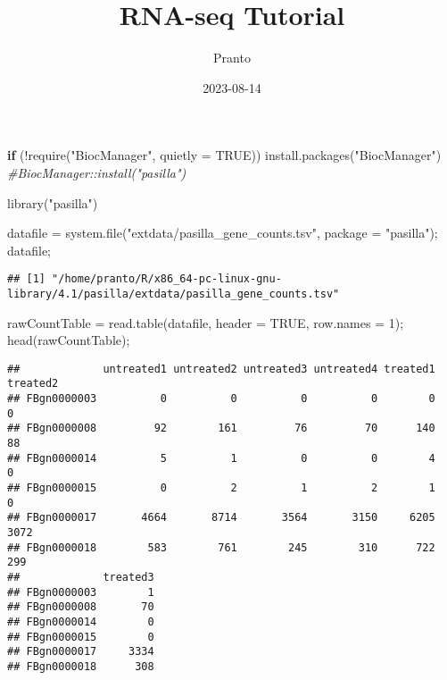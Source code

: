 \documentclass[
]{article}
\title{RNA-seq Tutorial}
\author{Pranto}
\date{2023-08-14}
\newenvironment{Shaded}{\begin{snugshade}}{\end{snugshade}}
\newcommand{\AttributeTok}[1]{\textcolor[rgb]{0.77,0.63,0.00}{#1}}
\newcommand{\CommentTok}[1]{\textcolor[rgb]{0.56,0.35,0.01}{\textit{#1}}}
\newcommand{\ConstantTok}[1]{\textcolor[rgb]{0.00,0.00,0.00}{#1}}
\newcommand{\ControlFlowTok}[1]{\textcolor[rgb]{0.13,0.29,0.53}{\textbf{#1}}}
\newcommand{\DecValTok}[1]{\textcolor[rgb]{0.00,0.00,0.81}{#1}}
\newcommand{\FunctionTok}[1]{\textcolor[rgb]{0.00,0.00,0.00}{#1}}
\newcommand{\NormalTok}[1]{#1}
\newcommand{\OtherTok}[1]{\textcolor[rgb]{0.56,0.35,0.01}{#1}}
\newcommand{\SpecialCharTok}[1]{\textcolor[rgb]{0.00,0.00,0.00}{#1}}
\newcommand{\StringTok}[1]{\textcolor[rgb]{0.31,0.60,0.02}{#1}}
\begin{document}
\maketitle

\begin{Shaded}
\begin{Highlighting}[]
\ControlFlowTok{if}\NormalTok{ (}\SpecialCharTok{!}\FunctionTok{require}\NormalTok{(}\StringTok{"BiocManager"}\NormalTok{, }\AttributeTok{quietly =} \ConstantTok{TRUE}\NormalTok{))}
    \FunctionTok{install.packages}\NormalTok{(}\StringTok{"BiocManager"}\NormalTok{)}
\CommentTok{\#BiocManager::install("pasilla")}

\FunctionTok{library}\NormalTok{(}\StringTok{"pasilla"}\NormalTok{)}

\NormalTok{datafile }\OtherTok{=} \FunctionTok{system.file}\NormalTok{(}\StringTok{"extdata/pasilla\_gene\_counts.tsv"}\NormalTok{, }\AttributeTok{package =} \StringTok{"pasilla"}\NormalTok{);}
\NormalTok{datafile;}
\end{Highlighting}
\end{Shaded}

\begin{verbatim}
## [1] "/home/pranto/R/x86_64-pc-linux-gnu-library/4.1/pasilla/extdata/pasilla_gene_counts.tsv"
\end{verbatim}

\begin{Shaded}
\begin{Highlighting}[]
\NormalTok{rawCountTable }\OtherTok{=} \FunctionTok{read.table}\NormalTok{(datafile, }\AttributeTok{header =} \ConstantTok{TRUE}\NormalTok{, }\AttributeTok{row.names =} \DecValTok{1}\NormalTok{);}
\FunctionTok{head}\NormalTok{(rawCountTable);}
\end{Highlighting}
\end{Shaded}

\begin{verbatim}
##             untreated1 untreated2 untreated3 untreated4 treated1 treated2
## FBgn0000003          0          0          0          0        0        0
## FBgn0000008         92        161         76         70      140       88
## FBgn0000014          5          1          0          0        4        0
## FBgn0000015          0          2          1          2        1        0
## FBgn0000017       4664       8714       3564       3150     6205     3072
## FBgn0000018        583        761        245        310      722      299
##             treated3
## FBgn0000003        1
## FBgn0000008       70
## FBgn0000014        0
## FBgn0000015        0
## FBgn0000017     3334
## FBgn0000018      308
\end{verbatim}
\end{document}
